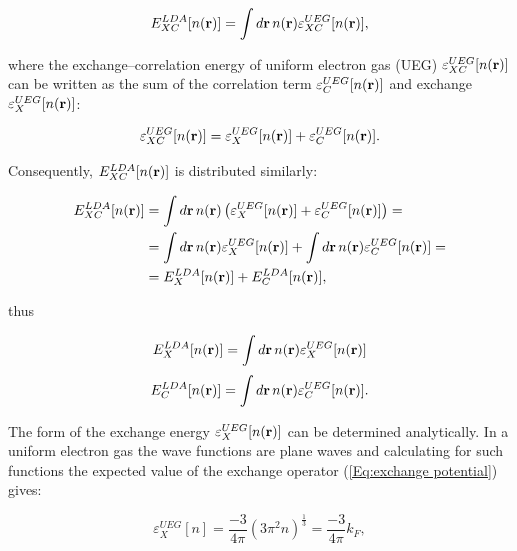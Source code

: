 \begin{equation}
    \label{Eq:Exc_LDA}    
    E_{XC}^{LDA}[n(\mathbf{r})]=\int d\mathbf{r}\, n(\mathbf{r})\varepsilon_{XC}^{UEG}[n(\mathbf{r})],
\end{equation}

where the exchange--correlation energy of uniform electron gas (UEG) $\varepsilon_{XC}^{UEG}[n(\mathbf{r})]$ can be written as the sum of the correlation term $\varepsilon_{C}^{UEG}[n(\mathbf{r})]$ and exchange $\varepsilon_{X}^{UEG}[n(\mathbf{r})]$:

\begin{equation}
    \label{Eq:epsxc_LDA}    
    \varepsilon_{XC}^{UEG}[n(\mathbf{r})]=\varepsilon_{X}^{UEG}[n(\mathbf{r})]+\varepsilon_{C}^{UEG}[n(\mathbf{r})].
\end{equation}

Consequently, $E_{XC}^{LDA}[n(\mathbf{r})]$ is distributed similarly:

\begin{equation}
    \label{Eq:Exc_LDA2}
    \begin{aligned}
        E_{XC}^{LDA}[n(\mathbf{r})]&=\int d\mathbf{r}\, n(\mathbf{r})\left(\varepsilon_{X}^{UEG}[n(\mathbf{r})]+\varepsilon_{C}^{UEG}[n(\mathbf{r})]
        \right)=\\
        &=\int d\mathbf{r}\, n(\mathbf{r})\varepsilon_{X}^{UEG}[n(\mathbf{r})]+\int d\mathbf{r}\, n(\mathbf{r})\varepsilon_{C}^{UEG}[n(\mathbf{r})]=\\
        &=E_{X}^{LDA}[n(\mathbf{r})]+E_{C}^{LDA}[n(\mathbf{r})],
    \end{aligned}
\end{equation}

thus

\begin{equation}
    \label{Eq:Ex_LDA}    
    E_{X}^{LDA}[n(\mathbf{r})]=\int d\mathbf{r}\, n(\mathbf{r})\varepsilon_{X}^{UEG}[n(\mathbf{r})]
\end{equation}
\begin{equation}
    \label{Eq:Ec_LDA}    
    E_{C}^{LDA}[n(\mathbf{r})]=\int d\mathbf{r}\, n(\mathbf{r})\varepsilon_{C}^{UEG}[n(\mathbf{r})].
\end{equation}

The form of the exchange energy $\varepsilon_{X}^{UEG}[n(\mathbf{r})]$ can be determined analytically.
In a uniform electron gas the wave functions are plane waves and calculating for such functions the expected value of the exchange operator (\ref{Eq:exchange potential}) gives:

\begin{equation}
    \label{Eq:epsx_LDA}    
    \varepsilon_{X}^{UEG}[n]=\frac{-3}{4\pi}\left(3\pi^2n\right)^\frac{1}{3}=\frac{-3}{4\pi}k_F,
\end{equation}

